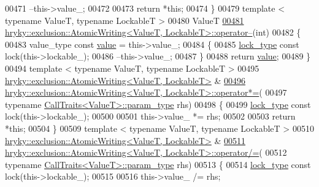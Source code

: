 \begin{DoxyCode}
{{{00471     --this->value\_;
00472 
00473     \textcolor{keywordflow}{return} *\textcolor{keyword}{this};
00474 \}
00479 \textcolor{keyword}{template} < \textcolor{keyword}{typename} ValueT, \textcolor{keyword}{typename} LockableT >
00480 ValueT
\hypertarget{exclusion__atomic_8h_source_l00481}{}\hyperlink{group__exclusion__control_ga39cdbea957f1abd0251446989d3f82ec}{00481} \hyperlink{classhryky_1_1exclusion_1_1_atomic_writing}{hryky::exclusion::AtomicWriting<ValueT, LockableT>::operator--}(\textcolor{keywordtype}{int})
00482 \{
00483     value\_type \textcolor{keyword}{const} \hyperlink{namespacehryky_1_1log_1_1format_a5b9af9c1a7b018d54144acfb1b8cc960}{value} = this->value\_;
00484     \{
00485         \hyperlink{classhryky_1_1exclusion_1_1_lock}{lock_type} \textcolor{keyword}{const} lock(this->lockable\_);
00486         --this->value\_;
00487     \}
00488     \textcolor{keywordflow}{return} \hyperlink{namespacehryky_1_1log_1_1format_a5b9af9c1a7b018d54144acfb1b8cc960}{value};
00489 \}
00494 \textcolor{keyword}{template} < \textcolor{keyword}{typename} ValueT, \textcolor{keyword}{typename} LockableT >
00495 \hyperlink{classhryky_1_1exclusion_1_1_atomic_writing}{hryky::exclusion::AtomicWriting<ValueT, LockableT>} & 
\hypertarget{exclusion__atomic_8h_source_l00496}{}\hyperlink{group__exclusion__control_ga6d7035d7bdfa0baa65e1e5580a617b34}{00496} \hyperlink{classhryky_1_1exclusion_1_1_atomic_writing}{hryky::exclusion::AtomicWriting<ValueT, LockableT>::operator*=}(
00497     \textcolor{keyword}{typename} \hyperlink{classhryky_1_1_call_traits}{CallTraits<ValueT>::param_type} rhs)
00498 \{
00499     \hyperlink{classhryky_1_1exclusion_1_1_lock}{lock_type} \textcolor{keyword}{const} lock(this->lockable\_);
00500 
00501     this->value\_ *= rhs;
00502     
00503     \textcolor{keywordflow}{return} *\textcolor{keyword}{this};
00504 \}
00509 \textcolor{keyword}{template} < \textcolor{keyword}{typename} ValueT, \textcolor{keyword}{typename} LockableT >
00510 \hyperlink{classhryky_1_1exclusion_1_1_atomic_writing}{hryky::exclusion::AtomicWriting<ValueT, LockableT>} & 
\hypertarget{exclusion__atomic_8h_source_l00511}{}\hyperlink{group__exclusion__control_ga298b802dc512f56b62eb79bdc842311d}{00511} \hyperlink{classhryky_1_1exclusion_1_1_atomic_writing}{hryky::exclusion::AtomicWriting<ValueT, LockableT>::operator/=}(
00512     \textcolor{keyword}{typename} \hyperlink{classhryky_1_1_call_traits}{CallTraits<ValueT>::param_type} rhs)
00513 \{
00514     \hyperlink{classhryky_1_1exclusion_1_1_lock}{lock_type} \textcolor{keyword}{const} lock(this->lockable\_);
00515 
00516     this->value\_ /= rhs;
}}}
\end{DoxyCode}
